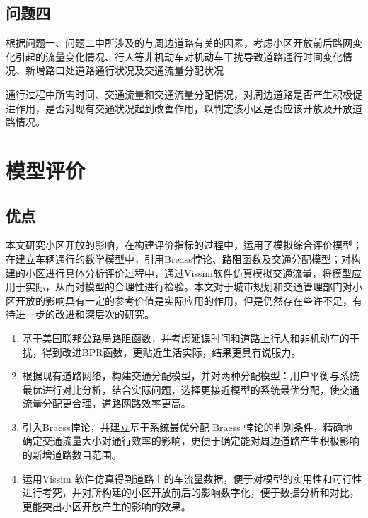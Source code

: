\documentclass[fontset=windows,a4paper,12pt]{ctexart}
\begin{document}
	\subsection{问题四}
		  根据问题一、问题二中所涉及的与周边道路有关的因素，考虑小区开放前后路网变化引起的流量变化情况、行人等非机动车对机动车干扰导致道路通行时间变化情况、新增路口处道路通行状况及交通流量分配状况

		通行过程中所需时间、交通流量和交通流量分配情况，对周边道路是否产生积极促进作用，是否对现有交通状况起到改善作用，以判定该小区是否应该开放及开放道路情况。
		
  \section{模型评价}
	  \subsection{优点}
		  本文研究小区开放的影响，在构建评价指标的过程中，运用了模拟综合评价模型；在建立车辆通行的数学模型中，引用Breass悖论、路阻函数及交通分配模型；对构建的小区进行具体分析评价过程中，通过Vissim软件仿真模拟交通流量，将模型应用于实际，从而对模型的合理性进行检验。本文对于城市规划和交通管理部门对小区开放的影响具有一定的参考价值是实际应用的作用，但是仍然存在些许不足，有待进一步的改进和深层次的研究。
		  \begin{enumerate}
		  	\item 基于美国联邦公路局路阻函数，并考虑延误时间和道路上行人和非机动车的干扰，得到改进BPR函数，更贴近生活实际，结果更具有说服力。
		  	\item 根据现有道路网络，构建交通分配模型，并对两种分配模型：用户平衡与系统最优进行对比分析，结合实际问题，选择更接近模型的系统最优分配，使交通流量分配更合理，道路网路效率更高。
		  	\item 引入Braess悖论，并建立基于系统最优分配 Braess 悖论的判别条件，精确地确定交通流量大小对通行效率的影响，更便于确定能对周边道路产生积极影响的新增道路数目范围。
		  	\item 运用Vissim 软件仿真得到道路上的车流量数据，便于对模型的实用性和可行性进行考究，并对所构建的小区开放前后的影响数字化，便于数据分析和对比，更能突出小区开放产生的影响的效果。
		  \end{enumerate}
\end{document}
